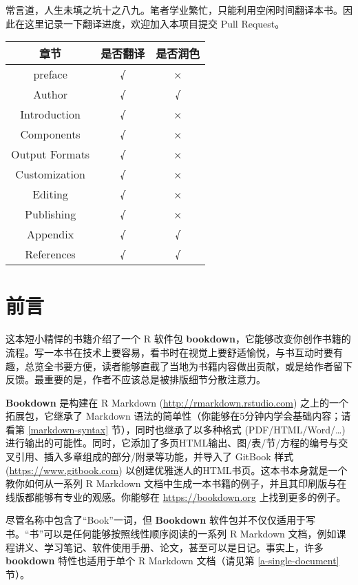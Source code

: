 \documentclass[
  12pt,
]{krantz}
\theoremstyle{definition}
\theoremstyle{definition}
\theoremstyle{definition}
\theoremstyle{definition}
\theoremstyle{remark}
\begin{document}
常言道，人生未填之坑十之八九。笔者学业繁忙，只能利用空闲时间翻译本书。因此在这里记录一下翻译进度，欢迎加入本项目提交 Pull Request。

\begin{longtable}[]{@{}ccc@{}}
\toprule\noalign{}
章节 & 是否翻译 & 是否润色 \\
\midrule\noalign{}
\endhead
\bottomrule\noalign{}
\endlastfoot
preface & √ & × \\
Author & √ & √ \\
Introduction & √ & × \\
Components & √ & × \\
Output Formats & √ & × \\
Customization & √ & × \\
Editing & √ & × \\
Publishing & √ & × \\
Appendix & √ & √ \\
References & √ & √ \\
\end{longtable}

\chapter*{前言}\label{ux524dux8a00}


这本短小精悍的书籍介绍了一个 R 软件包 \textbf{bookdown}，它能够改变你创作书籍的流程。写一本书在技术上要容易，看书时在视觉上要舒适愉悦，与书互动时要有趣，总览全书要方便，读者能够直截了当地为书籍内容做出贡献，或是给作者留下反馈。最重要的是，作者不应该总是被排版细节分散注意力。

\textbf{Bookdown} 是构建在 R Markdown (\url{http://rmarkdown.rstudio.com}) 之上的一个拓展包，它继承了 Markdown 语法的简单性（你能够在5分钟内学会基础内容；请看第 \ref{markdown-syntax} 节），同时也继承了以多种格式 (PDF/HTML/Word/\ldots) 进行输出的可能性。同时，它添加了多页HTML输出、图/表/节/方程的编号与交叉引用、插入多章组成的部分/附录等功能，并导入了 GitBook 样式 (\url{https://www.gitbook.com}) 以创建优雅迷人的HTML书页。这本书本身就是一个教你如何从一系列 R Markdown 文档中生成一本书籍的例子，并且其印刷版与在线版都能够有专业的观感。你能够在 \url{https://bookdown.org} 上找到更多的例子。

尽管名称中包含了``Book''一词，但 \textbf{Bookdown} 软件包并不仅仅适用于写书。``书''可以是任何能够按照线性顺序阅读的一系列 R Markdown 文档，例如课程讲义、学习笔记、软件使用手册、论文，甚至可以是日记。事实上，许多 \textbf{bookdown} 特性也适用于单个 R Markdown 文档（请见第 \ref{a-single-document} 节）。
\end{document}
